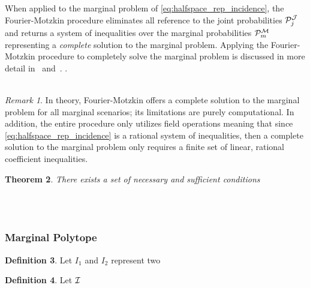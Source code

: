 \documentclass[aps, 10pt, english, twoside, pra, nofootinbib, longbibliography]{revtex4-1}
\theoremstyle{plain}
\newtheorem{theorem}{Theorem}
\theoremstyle{definition}
\newtheorem{definition}[theorem]{Definition}
\theoremstyle{remark}
\newtheorem{remark}[theorem]{Remark}
\newcommand{\mscenario}{\mathcal{M}}
\newcommand{\jointvar}{\mathcal{J}}
\begin{document}
    When applied to the marginal problem of \cref{eq:halfspace_rep_incidence}, the Fourier-Motzkin procedure eliminates all reference to the joint probabilities $\probvec^{\jointvar}_j$ and returns a system of inequalities over the marginal probabilities $\probvec^{\mscenario}_m$ representing a \textit{complete} solution to the marginal problem. Applying the Fourier-Motzkin procedure to completely solve the marginal problem is discussed in more detail in~\cite{Inflation} and~\cite{Fritz_2011}. . \\

    \\

    \begin{remark}
        In theory, Fourier-Motzkin offers a complete solution to the marginal problem for all marginal scenarios; its limitations are purely computational. In addition, the entire procedure only utilizes field operations \cite{Abramsky_2012} meaning that since \cref{eq:halfspace_rep_incidence} is a rational system of inequalities, then a complete solution to the marginal problem only requires a finite set of linear, rational coefficient inequalities.
    \end{remark}

    \begin{theorem}
        There exists a set of necessary and sufficient conditions

    \end{theorem}



     \\
     \\
    \subsubsection{Marginal Polytope}
    \begin{definition}
        Let $I_{1}$ and $I_{2}$ represent two
    \end{definition}
    \begin{definition}
        Let $\mathcal{I}$
    \end{definition}
\end{document}
